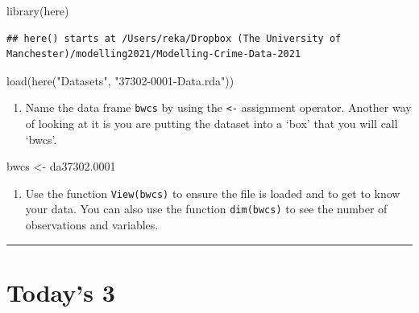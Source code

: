 \documentclass[
]{book}
\newenvironment{Shaded}{\begin{snugshade}}{\end{snugshade}}
\newcommand{\FloatTok}[1]{\textcolor[rgb]{0.00,0.00,0.81}{#1}}
\newcommand{\FunctionTok}[1]{\textcolor[rgb]{0.00,0.00,0.00}{#1}}
\newcommand{\NormalTok}[1]{#1}
\newcommand{\OtherTok}[1]{\textcolor[rgb]{0.56,0.35,0.01}{#1}}
\newcommand{\StringTok}[1]{\textcolor[rgb]{0.31,0.60,0.02}{#1}}
\providecommand{\tightlist}{%
  \setlength{\itemsep}{0pt}\setlength{\parskip}{0pt}}
\begin{document}
\begin{Shaded}
\begin{Highlighting}[]
\FunctionTok{library}\NormalTok{(here)}
\end{Highlighting}
\end{Shaded}

\begin{verbatim}
## here() starts at /Users/reka/Dropbox (The University of Manchester)/modelling2021/Modelling-Crime-Data-2021
\end{verbatim}

\begin{Shaded}
\begin{Highlighting}[]
\FunctionTok{load}\NormalTok{(}\FunctionTok{here}\NormalTok{(}\StringTok{"Datasets"}\NormalTok{, }\StringTok{"37302{-}0001{-}Data.rda"}\NormalTok{))}
\end{Highlighting}
\end{Shaded}

\begin{enumerate}
\def\labelenumi{\arabic{enumi}.}
\setcounter{enumi}{4}
\tightlist
\item
  Name the data frame \texttt{bwcs} by using the \texttt{\textless{}-} assignment operator. Another way of looking at it is you are putting the dataset into a `box' that you will call `bwcs'.
\end{enumerate}

\begin{Shaded}
\begin{Highlighting}[]
\NormalTok{bwcs }\OtherTok{\textless{}{-}}\NormalTok{ da37302}\FloatTok{.0001}
\end{Highlighting}
\end{Shaded}

\begin{enumerate}
\def\labelenumi{\arabic{enumi}.}
\setcounter{enumi}{5}
\tightlist
\item
  Use the function \texttt{View(bwcs)} to ensure the file is loaded and to get to know your data. You can also use the function \texttt{dim(bwcs)} to see the number of observations and variables.
\end{enumerate}

\begin{center}\rule{0.5\linewidth}{0.5pt}\end{center}

\hypertarget{todays-3-1}{%
\section{Today's 3}\label{todays-3-1}}
\end{document}
